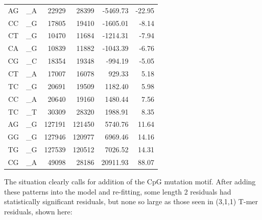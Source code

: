 \documentclass{article}
\newcommand{\nA}{\mbox{A}}  %
\newcommand{\nC}{\mbox{C}}
\newcommand{\nG}{\mbox{G}}
\newcommand{\nT}{\mbox{T}}
\theoremstyle{plain}
\theoremstyle{definition}
\begin{document}
\begin{center}
\begin{tabular}{ccrrrr}
                \nA\nG  &  \_\nA  &   22929  &   28399  &   -5469.73  &  -22.95 \\
                \nC\nC  &  \_\nG  &   17805  &   19410  &   -1605.01  &   -8.14 \\
                \nC\nT  &  \_\nG  &   10470  &   11684  &   -1214.31  &   -7.94 \\
                \nC\nA  &  \_\nG  &   10839  &   11882  &   -1043.39  &   -6.76 \\
                \nC\nG  &  \_\nC  &   18354  &   19348  &    -994.19  &   -5.05 \\
                \hline
                \nC\nT  &  \_\nA  &   17007  &   16078  &     929.33  &    5.18 \\
                \nT\nC  &  \_\nG  &   20691  &   19509  &    1182.40  &    5.98 \\
                \nC\nC  &  \_\nA  &   20640  &   19160  &    1480.44  &    7.56 \\
                \nT\nC  &  \_\nT  &   30309  &   28320  &    1988.91  &    8.35 \\
                \nA\nG  &  \_\nG  &  127191  &  121450  &    5740.76  &   11.64 \\
                \nG\nG  &  \_\nG  &  127946  &  120977  &    6969.46  &   14.16 \\
                \nT\nG  &  \_\nG  &  127539  &  120512  &    7026.52  &   14.31 \\
                \nC\nG  &  \_\nA  &   49098  &   28186  &   20911.93  &   88.07 \\
                \hline
        \end{tabular}
    \end{center}
The situation clearly calls for addition of the CpG mutation motif.
After adding these patterns into the model and re-fitting,
some length 2 residuals had statistically significant residuals,
but none so large as those seen in (3,1,1) T-mer residuals, shown here:
\end{document}
